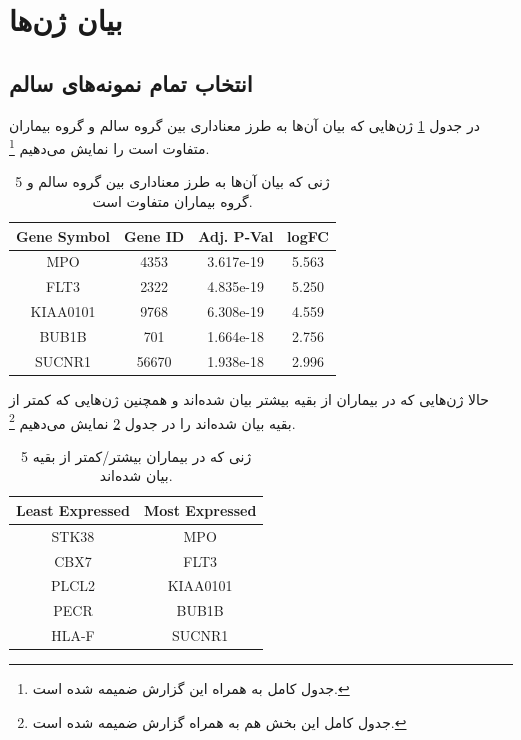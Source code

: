 \documentclass{article}
\begin{document}
\section{بیان ژن‌ها}
\subsection{انتخاب تمام نمونه‌های سالم}
در جدول \ref{tab:genes} ژن‌هایی که بیان آن‌ها به طرز معناداری بین گروه سالم و گروه بیماران متفاوت است را نمایش می‌دهیم
\footnote{جدول کامل به همراه این گزارش ضمیمه شده است.}.

\begin{table}[h!]
	\begin{latin}
		\begin{center}
			\begin{tabular}{@{}cccc@{}}
				\toprule
				Gene Symbol & Gene ID & Adj. P-Val & logFC  \\ \midrule
				MPO         & 4353    & 3.617e-19 & 5.563 \\
				FLT3        & 2322    & 4.835e-19 & 5.250 \\
				KIAA0101    & 9768    & 6.308e-19 & 4.559 \\
				BUB1B       & 701     & 1.664e-18 & 2.756 \\
				SUCNR1      & 56670   & 1.938e-18 & 2.996 \\ \bottomrule
			\end{tabular}
		\end{center}
	\end{latin}
	\caption{5 ژنی که بیان آن‌ها به طرز معناداری بین گروه سالم و گروه بیماران متفاوت است.}
	\label{tab:genes}
\end{table}

حالا ژن‌هایی که در بیماران از بقیه بیشتر بیان شده‌اند و همچنین ژن‌هایی که کمتر از بقیه بیان شده‌اند را در جدول \ref{tab:up-down} نمایش می‌دهیم
\footnote{جدول کامل این بخش هم به همراه گزارش ضمیمه شده است.}.

\begin{table}[h!]
	\begin{latin}
		\begin{center}
			\begin{tabular}{@{}cc@{}}
				\toprule
				Least Expressed & Most Expressed \\ \midrule
				STK38          & MPO             \\
				CBX7           & FLT3            \\
				PLCL2          & KIAA0101        \\
				PECR           & BUB1B           \\
				HLA-F          & SUCNR1          \\ \bottomrule
			\end{tabular}
		\end{center}
	\end{latin}
	\caption{5 ژنی که در بیماران بیشتر/کمتر از بقیه بیان شده‌اند.}
	\label{tab:up-down}
\end{table}
\end{document}

